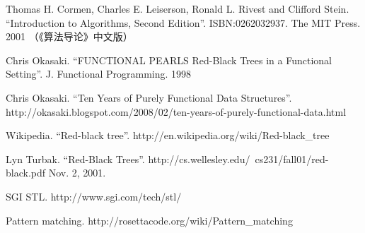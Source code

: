 \documentclass[b5paper]{ctexart}
\begin{document}
\ifx\wholebook\relax \else
\begin{thebibliography}{99}

Thomas H. Cormen, Charles E. Leiserson, Ronald L. Rivest and Clifford Stein.
``Introduction to Algorithms, Second Edition''. ISBN:0262032937. The MIT Press. 2001 （《算法导论》中文版）

Chris Okasaki. ``FUNCTIONAL PEARLS Red-Black Trees in a Functional Setting''. J. Functional Programming. 1998

Chris Okasaki. ``Ten Years of Purely Functional Data Structures''. http://okasaki.blogspot.com/2008/02/ten-years-of-purely-functional-data.html

Wikipedia. ``Red-black tree''. http://en.wikipedia.org/wiki/Red-black\_tree

Lyn Turbak. ``Red-Black Trees''. http://cs.wellesley.edu/~cs231/fall01/red-black.pdf Nov. 2, 2001.

SGI STL. http://www.sgi.com/tech/stl/

Pattern matching. http://rosettacode.org/wiki/Pattern\_matching

\end{thebibliography}
\end{document}
